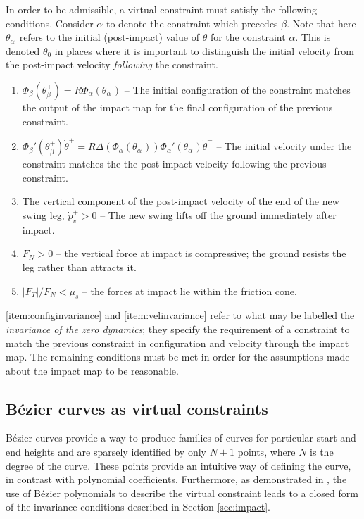 In order to be admissible, a virtual constraint must satisfy the following conditions. Consider $\alpha$ to denote the constraint which precedes $\beta$. Note that here $\theta_\alpha^+$ refers to the initial (post-impact) value of $\theta$ for the constraint $\alpha$. This is denoted $\theta_0$ in places where it is important to distinguish the initial velocity from the post-impact velocity \textit{following} the constraint.
\begin{samepage}
\begin{adjustwidth}{1.8cm}{}
\begin{enumerate}[label=\bfseries Condition \arabic*, parsep=0pt]
	\item $\Phi_\beta\left(\theta_\beta^+\right) = R\Phi_\alpha\left(\theta_\alpha^-\right)$ -- The initial configuration of the constraint matches the output of the impact map for the final configuration of the previous constraint. \label{item:configinvariance}
	\item $\Phi_\beta'\left(\theta_\beta^+\right)\dot{\theta}^+ = R\Delta\left(\Phi_\alpha(\theta_\alpha^-)\right)\Phi_\alpha'\left(\theta_\alpha^-\right)\dot{\theta}^-$ -- The initial velocity under the constraint matches the the post-impact velocity following the previous constraint. \label{item:velinvariance}
	\item The vertical component of the post-impact velocity of the end of the new swing leg, $\dot{p}_v^+ > 0$ -- The new swing lifts off the ground immediately after impact. \label{item:liftoff}
	\item $F_N > 0$ -- the vertical force at impact is compressive; the ground resists the leg rather than attracts it. \label{item:posnormalF}
	\item $|F_T|/F_N<\mu_s$ -- the forces at impact lie within the friction cone. \label{item:frictioncone}
\end{enumerate}
\end{adjustwidth}
\end{samepage}

\ref{item:configinvariance} and \ref{item:velinvariance} refer to what may be labelled the \textit{invariance of the zero dynamics}; they specify the requirement of a constraint to match the previous constraint in configuration and velocity through the impact map. The remaining conditions must be met in order for the assumptions made about the impact map to be reasonable.

\subsection{B{\'e}zier curves as virtual constraints} \label{sec:bezconstraints}
Bézier curves provide a way to produce families of curves for particular start and end heights and are sparsely identified by only $N+1$ points, where $N$ is the degree of the curve. These points provide an intuitive way of defining the curve, in contrast with polynomial coefficients. Furthermore, as demonstrated in \cite{westervelt2007feedback}, the use of Bézier polynomials to describe the virtual constraint leads to a closed form of the invariance conditions described in Section \ref{sec:impact}. 

